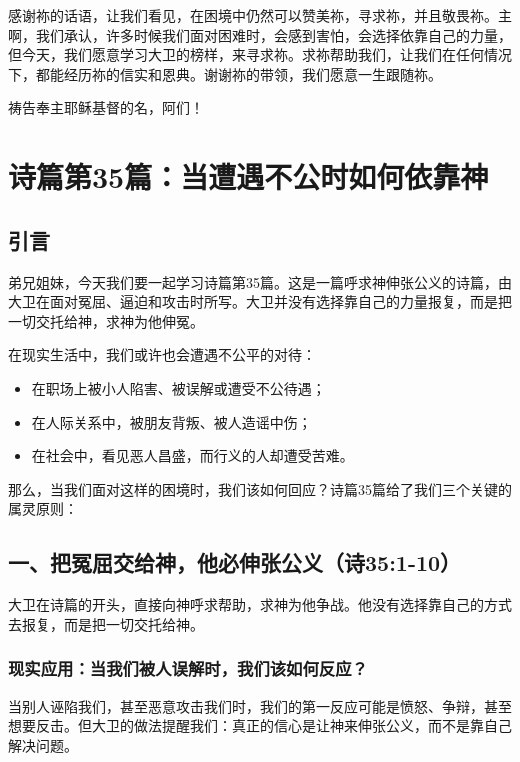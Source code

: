 \documentclass[a4paper, 12pt]{article}
\begin{document}
感谢祢的话语，让我们看见，在困境中仍然可以赞美祢，寻求祢，并且敬畏祢。主啊，我们承认，许多时候我们面对困难时，会感到害怕，会选择依靠自己的力量，但今天，我们愿意学习大卫的榜样，来寻求祢。求祢帮助我们，让我们在任何情况下，都能经历祢的信实和恩典。谢谢祢的带领，我们愿意一生跟随祢。

祷告奉主耶稣基督的名，阿们！
\newpage
\section{诗篇第35篇：当遭遇不公时如何依靠神}
\subsection*{引言}
\hspace{0.6cm}弟兄姐妹，今天我们要一起学习诗篇第35篇。这是一篇呼求神伸张公义的诗篇，由大卫在面对冤屈、逼迫和攻击时所写。大卫并没有选择靠自己的力量报复，而是把一切交托给神，求神为他伸冤。

在现实生活中，我们或许也会遭遇不公平的对待：


\begin{itemize}

    \item 在职场上被小人陷害、被误解或遭受不公待遇；
    \item 在人际关系中，被朋友背叛、被人造谣中伤；

    \item 在社会中，看见恶人昌盛，而行义的人却遭受苦难。

\end{itemize}

那么，当我们面对这样的困境时，我们该如何回应？诗篇35篇给了我们三个关键的属灵原则：

\subsection*{一、把冤屈交给神，他必伸张公义（诗35:1-10）}

大卫在诗篇的开头，直接向神呼求帮助，求神为他争战。他没有选择靠自己的方式去报复，而是把一切交托给神。

\subsubsection*{现实应用：当我们被人误解时，我们该如何反应？}
当别人诬陷我们，甚至恶意攻击我们时，我们的第一反应可能是愤怒、争辩，甚至想要反击。但大卫的做法提醒我们：真正的信心是让神来伸张公义，而不是靠自己解决问题。
\end{document}

